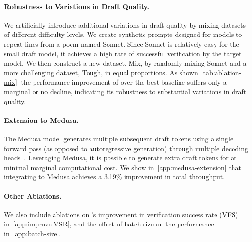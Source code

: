 \begin{table}[!ht]
    \centering
    \caption{\alg{} improvement in throughput for ablation study of robustness to variations in draft quality.}
    \label{tab:ablation-mix}
    \vspace{-3mm}
\end{table}

\paragraph{Robustness to Variations in Draft Quality.}
We artificially introduce additional variations in draft quality by mixing datasets of different difficulty levels.
We create synthetic prompts designed for models to repeat lines from a poem named Sonnet.
Since Sonnet is relatively easy for the small draft model, it achieves a high rate of successful verification by the target model.
We then construct a new dataset, Mix, by randomly mixing Sonnet and a more challenging dataset, Tough, in equal proportions.
As shown~\cref{tab:ablation-mix}, the performance improvement of \alg{} over the best baseline suffers only a marginal or no decline, indicating its robustness to substantial variations in draft quality.

\paragraph{Extension to Medusa.}
The Medusa model generates multiple subsequent draft tokens using a single forward pass (as opposed to autoregressive generation) through multiple decoding heads~\citep{cai2024medusa}.
Leveraging Medusa, it is possible to generate extra draft tokens for \alg{} at minimal marginal computational cost.
We show in~\cref{app:medusa-extension} that integrating \alg{} to Medusa achieves a 3.19\% improvement in total throughput.


\paragraph{Other Ablations.}
We also include ablations on \alg{}'s improvement in verification success rate (VFS) in~\cref{app:improve-VSR}, and the effect of batch size on the performance in~\cref{app:batch-size}.
